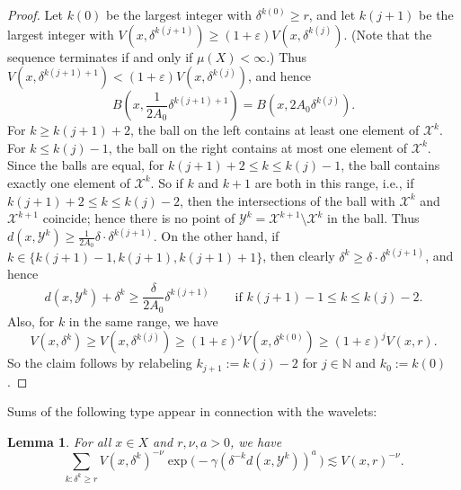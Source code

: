 \documentclass{amsart}
\numberwithin{equation}{section}
\theoremstyle{plain}
\newtheorem{lemma}[equation]{Lemma}
\theoremstyle{definition}
\theoremstyle{remark}
\begin{document}
{{{\begin{proof}
Let $k(0)$ be the largest integer with $\delta^{k(0)}\geq r$, and let $k(j+1)$ be the largest integer with $V(x,\delta^{k(j+1)})\geq(1+\varepsilon)V(x,\delta^{k(j)})$. (Note that the sequence terminates if and only if $\mu(X)<\infty$.) Thus $V(x,\delta^{k(j+1)+1})<(1+\varepsilon)V(x,\delta^{k(j)})$, and hence
\begin{equation*}
  B(x,\frac{1}{2A_{0}}\delta^{k(j+1)+1})=B(x,2A_{0}\delta^{k(j)}).
\end{equation*}
For $k\geq k(j+1)+2$, the ball on the left contains at least one element of $\mathscr{X}^k$. For $k\leq k(j)-1$, the ball on the right contains at most one element of $\mathscr{X}^k$. Since the balls are equal, for $k(j+1)+2\leq k\leq k(j)-1$, the ball contains exactly one element of $\mathscr{X}^k$. So if $k$ and $k+1$ are both in this range, i.e., if $k(j+1)+2\leq k\leq k(j)-2$, then the intersections of the ball with $\mathscr{X}^k$ and $\mathscr{X}^{k+1}$ coincide; hence there is no point of $\mathscr{Y}^k=\mathscr{X}^{k+1}\setminus\mathscr{X}^k$ in the ball. Thus $d(x,\mathscr{Y}^k)\geq \frac{1}{2A_{0}}\delta\cdot\delta^{k(j+1)}$. On the other hand, if $k\in\{k(j+1)-1,k(j+1),k(j+1)+1\}$, then clearly $\delta^k\geq\delta\cdot\delta^{k(j+1)}$, and hence
\begin{equation*}
  d(x,\mathscr{Y}^k)+\delta^k\geq\frac{\delta}{2A_{0}}\delta^{k(j+1)}\qquad\text{if } k(j+1)-1\leq k\leq k(j)-2.
\end{equation*}
Also, for $k$ in the same range, we have
\begin{equation*}
  V(x,\delta^k)
  \geq V(x,\delta^{k(j)})\geq (1+\varepsilon)^j V(x,\delta^{k(0)})\geq (1+\varepsilon)^j V(x,r).
\end{equation*}
So the claim follows by relabeling $k_{j+1}:=k(j)-2$ for $j\in{\mathbb{N}}$ and $k_0:=k(0)$. 
\end{proof}

Sums of the following type appear in connection with the wavelets:

\begin{lemma}\label{lem:sumLargeBalls} 
For all $x\in X$ and $r,\nu, a>0$, we have
\begin{equation*}
  \sum_{k:\delta^k\geq r}V(x,\delta^k)^{-\nu}\exp\big(-\gamma(\delta ^{-k}{d(x,\mathscr{Y}^k)})^a\,  \big)\lesssim V(x,r)^{-\nu}.
\end{equation*}
\end{lemma}

}}}
\end{document}
